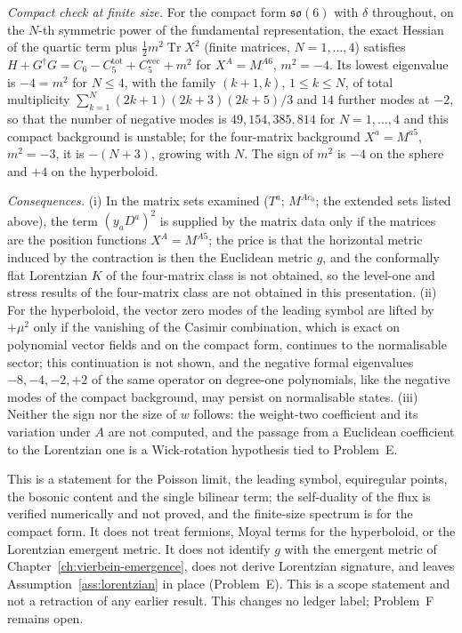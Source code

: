 \emph{Compact check at finite size.} For the compact form \(\mathfrak{so}(6)\) with \(\delta\) throughout, on the \(N\)-th symmetric power of the fundamental representation, the exact Hessian of the quartic term plus \(\tfrac12m^2\operatorname{Tr}X^2\) (finite matrices, \(N=1,\dots,4\)) satisfies \(H+G^\dagger G=C_6-C_5^{\mathrm{tot}}+C_5^{\mathrm{vec}}+m^2\) for \(X^A=M^{A6}\), \(m^2=-4\). Its lowest eigenvalue is \(-4=m^2\) for \(N\le4\), with the family \((k+1,k)\), \(1\le k\le N\), of total multiplicity \(\sum_{k=1}^{N}(2k+1)(2k+3)(2k+5)/3\) and \(14\) further modes at \(-2\), so that the number of negative modes is \(49,154,385,814\) for \(N=1,\dots,4\) and this compact background is unstable; for the four-matrix background \(X^a=M^{a5}\), \(m^2=-3\), it is \(-(N+3)\), growing with \(N\). The sign of \(m^2\) is \(-4\) on the sphere and \(+4\) on the hyperboloid.



\emph{Consequences.} (i) In the matrix sets examined (\(T^a\); \(M^{Ac_0}\); the extended sets listed above), the term \((y_aD^a)^2\) is supplied by the matrix data only if the matrices are the position functions \(X^A=M^{A5}\); the price is that the horizontal metric induced by the contraction is then the Euclidean metric \(g\), and the conformally flat Lorentzian \(K\) of the four-matrix class is not obtained, so the level-one and stress results of the four-matrix class are not obtained in this presentation. (ii) For the hyperboloid, the vector zero modes of the leading symbol are lifted by \(+\mu^2\) only if the vanishing of the Casimir combination, which is exact on polynomial vector fields and on the compact form, continues to the normalisable sector; this continuation is not shown, and the negative formal eigenvalues \(-8,-4,-2,+2\) of the same operator on degree-one polynomials, like the negative modes of the compact background, may persist on normalisable states. (iii) Neither the sign nor the size of \(w\) follows: the weight-two coefficient and its variation under \(A\) are not computed, and the passage from a Euclidean coefficient to the Lorentzian one is a Wick-rotation hypothesis tied to Problem~E.



This is a statement for the Poisson limit, the leading symbol, equiregular points, the bosonic content and the single bilinear term; the self-duality of the flux is verified numerically and not proved, and the finite-size spectrum is for the compact form. It does not treat fermions, Moyal terms for the hyperboloid, or the Lorentzian emergent metric. It does not identify \(g\) with the emergent metric of Chapter~\ref{ch:vierbein-emergence}, does not derive Lorentzian signature, and leaves Assumption~\ref{ass:lorentzian} in place (Problem~E). This is a scope statement and not a retraction of any earlier result. This changes no ledger label; Problem~F remains open.





